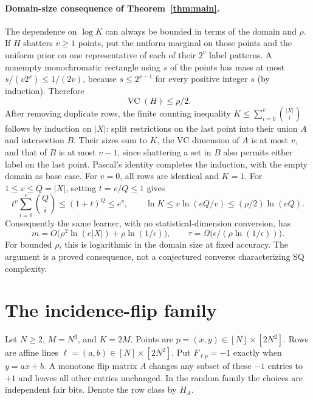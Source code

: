 \documentclass[11pt]{article}
\newcommand{\1}{\mathbf 1}
\begin{document}
\paragraph{Domain-size consequence of Theorem~\ref{thm:main}.}
The dependence on $\log K$ can always be bounded in terms of the domain and $\rho$. If $H$ shatters $v\ge1$ points, put the uniform marginal on those points and the uniform prior on one representative of each of their $2^v$ label patterns. A nonempty monochromatic rectangle using $s$ of the points has mass at most $s/(v2^s)\le1/(2v)$, because $s\le2^{s-1}$ for every positive integer $s$ (by induction). Therefore
\[
 \operatorname{VC}(H)\le\rho/2.
\]
After removing duplicate rows, the finite counting inequality $K\le\sum_{i=0}^v\binom{|X|}{i}$ follows by induction on $|X|$: split restrictions on the last point into their union $A$ and intersection $B$. Their sizes sum to $K$, the VC dimension of $A$ is at most $v$, and that of $B$ is at most $v-1$, since shattering a set in $B$ also permits either label on the last point. Pascal's identity completes the induction, with the empty domain as base case. For $v=0$, all rows are identical and $K=1$. For $1\le v\le Q=|X|$, setting $t=v/Q\le1$ gives
\[
 t^v\sum_{i=0}^v\binom Qi\le(1+t)^Q\le e^v,
 \qquad \ln K\le v\ln(eQ/v)\le(\rho/2)\ln(eQ).
\]
Consequently the same learner, with no statistical-dimension conversion, has
\[
 \boxed{m=O\bigl(\rho^2\ln(e|X|)+\rho\ln(1/\epsilon)\bigr),
 \qquad \tau=\Omega\bigl(\epsilon/(\rho\ln(1/\epsilon))\bigr).}
\]
For bounded $\rho$, this is logarithmic in the domain size at fixed accuracy. The argument is a proved consequence, not a conjectured converse characterizing SQ complexity.

\section{The incidence-flip family}
Let $N\ge2$, $M=N^3$, and $K=2M$. Points are $p=(x,y)\in[N]\times[2N^2]$. Rows are affine lines $\ell=(a,b)\in[N]\times[2N^2]$. Put $F_{\ell p}=-1$ exactly when $y=ax+b$. A monotone flip matrix $A$ changes any subset of these $-1$ entries to $+1$ and leaves all other entries unchanged. In the random family the choices are independent fair bits. Denote the row class by $H_A$.
\end{document}
